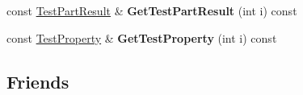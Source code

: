 \begin{DoxyCompactItemize}
\item 
\hypertarget{classtesting_1_1_test_result_a5ea65e4a7c4fc9c9dc9578223a599a7c}{}const \hyperlink{classtesting_1_1_test_part_result}{Test\+Part\+Result} \& {\bfseries Get\+Test\+Part\+Result} (int i) const \label{classtesting_1_1_test_result_a5ea65e4a7c4fc9c9dc9578223a599a7c}

\item 
\hypertarget{classtesting_1_1_test_result_a89a4f580a5d969b36e016cd309b235bd}{}const \hyperlink{classtesting_1_1_test_property}{Test\+Property} \& {\bfseries Get\+Test\+Property} (int i) const \label{classtesting_1_1_test_result_a89a4f580a5d969b36e016cd309b235bd}

\end{DoxyCompactItemize}
\subsection*{Friends}
